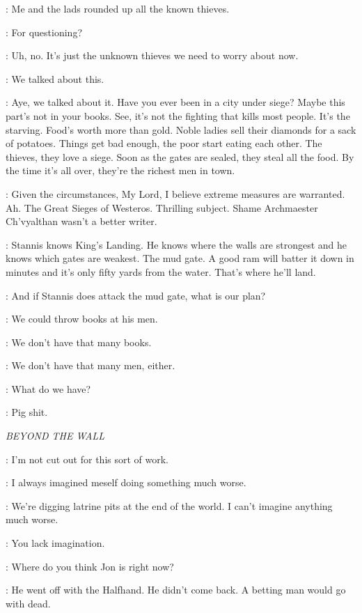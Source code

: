 \BRONN: Me and the lads rounded up all the known thieves. 

\TYRION: For questioning? 

\BRONN: Uh, no. It's just the unknown thieves we need to worry about now. 

\TYRION: We talked about this. 

\BRONN: Aye, we talked about it. Have you ever been in a city under siege? Maybe this part's not in your books. See, it's not the fighting that kills most people. It's the starving. Food's worth more than gold. Noble ladies sell their diamonds for a sack of potatoes. Things get bad enough, the poor start eating each other. The thieves, they love a siege. Soon as the gates are sealed, they steal all the food. By the time it's all over, they're the richest men in town. 

\VARYS: Given the circumstances, My Lord, I believe extreme measures are warranted. Ah. The Great Sieges of Westeros. 
Thrilling subject. Shame Archmaester Ch'vyalthan wasn't a better writer. 

\TYRION: Stannis knows King's Landing. He knows where the walls are strongest and he knows which gates are weakest. The mud gate. A good ram will batter it down in minutes and it's only fifty yards from the water. That's where he'll land. 

\VARYS: And if Stannis does attack the mud gate, what is our plan? 

\BRONN: We could throw books at his men. 

\VARYS: We don't have that many books. 

\BRONN: We don't have that many men, either. 

\VARYS: What do we have? 

\TYRION: Pig shit. 


\scene

\textit{BEYOND THE WALL} 


\SAM: I'm not cut out for this sort of work. 

\EDD: I always imagined meself doing something much worse. 

\GRENN: We're digging latrine pits at the end of the world. I can't imagine anything much worse. 

\EDD: You lack imagination. 

\SAM: Where do you think Jon is right now? 

\EDD: He went off with the Halfhand. He didn't come back. A betting man would go with dead. 


